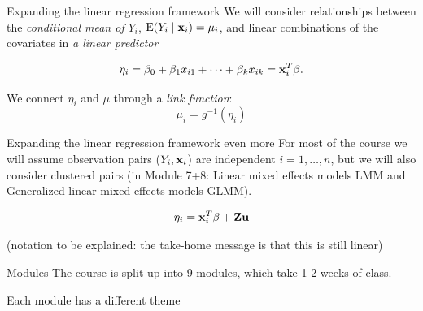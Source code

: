\documentclass[
  ignorenonframetext,
]{beamer}
\begin{document}
\begin{frame}
\begin{block}{Expanding the linear regression framework}
\protect\hypertarget{expanding-the-linear-regression-framework}{}
We will consider relationships between the \emph{conditional mean of
\(Y_i\)}, \(\text{E}(Y_i\mid {\bf x}_i)=\mu_i\), and linear combinations
of the covariates in \emph{a linear predictor}

\[
\eta_i=\beta_0+\beta_1 x_{i1}+\cdots +\beta_k x_{ik}={\bf x}_i^T {\bf \beta}.
\]

We connect \(\eta_i\) and \(\mu\) through a \emph{link function}:
\[\mu_i = g^{-1}(\eta_i)\]
\end{block}
\end{frame}

\begin{frame}
\begin{block}{Expanding the linear regression framework even more}
\protect\hypertarget{expanding-the-linear-regression-framework-even-more}{}
For most of the course we will assume observation pairs
(\(Y_i,{\bf x}_i\)) are independent \(i=1,\ldots,n\), but we will also
consider clustered pairs (in Module 7+8: Linear mixed effects models LMM
and Generalized linear mixed effects models GLMM).

\[
\eta_i={\bf x}_i^T {\bf \beta} + \bf{Z} u
\]

(notation to be explained: the take-home message is that this is still
linear)
\end{block}
\end{frame}

\begin{frame}
\begin{block}{Modules}
\protect\hypertarget{modules}{}
The course is split up into 9 modules, which take 1-2 weeks of class.

Each module has a different theme
\end{block}
\end{frame}
\end{document}
